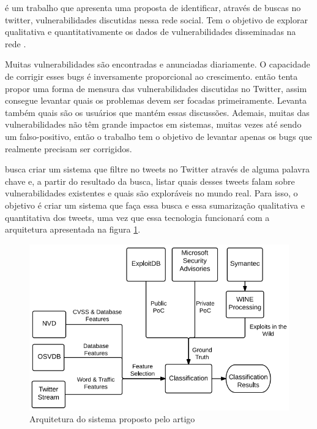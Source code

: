  é um trabalho que apresenta uma proposta de identificar, através de buscas no twitter, vulnerabilidades discutidas nessa rede social. Tem o objetivo de explorar qualitativa e quantitativamente os dados de vulnerabilidades disseminadas na rede \cite{Sabottke2015}. 

Muitas vulnerabilidades são encontradas e anunciadas diariamente. O capacidade de corrigir esses bugs é inversamente proporcional ao crescimento.  então tenta propor uma forma de mensura das vulnerabilidades discutidas no Twitter, assim consegue levantar quais os problemas devem ser focadas primeiramente. Levanta também quais são os usuários que mantém essas discussões. Ademais, muitas das vulnerabilidades não têm grande impactos em sistemas, muitas vezes até sendo um falso-positivo, então o trabalho tem o objetivo de levantar apenas os bugs que realmente precisam ser corrigidos.

 busca criar um sistema que filtre no tweets no Twitter através de alguma palavra chave e, a partir do resultado da busca, listar quais desses tweets falam sobre vulnerabilidades existentes e quais são exploráveis no mundo real. Para isso, o objetivo é criar um sistema que faça essa busca e essa sumarização qualitativa e quantitativa dos tweets, uma vez que essa tecnologia funcionará com a arquitetura apresentada na figura \ref{fig:Sabottke}.

\begin{figure}[H]
\centering
\includegraphics[width=1\textwidth]{imagens/Sabottke.png}
\caption{Arquitetura do sistema proposto pelo artigo }
\label{fig:Sabottke}
\end{figure}

